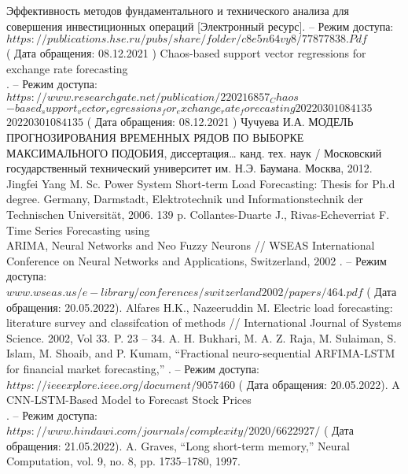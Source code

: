 \begin{thebibliography}{}
    \newblock Эффективность методов фундаментального и технического анализа для \\
    совершения  инвестиционных операций [Электронный ресурс]. – Режим доступа: 
    \newblock $https://publications.hse.ru/pubs/share/folder/c8e5n64vy8/77877838.Pdf$ \\
    ( Дата обращения: 08.12.2021 )
    \newblock Chaos-based support vector regressions for exchange rate forecasting \\
    . – Режим доступа: \\
    \newblock $https://www.researchgate.net/publication/220216857_Chaos$\\
    \newblock $-based_support_vector_regressions_for_exchange_rate_forecasting20220301084135$\\
    \newblock $20220301084135$ ( Дата обращения: 08.12.2021 )
    \newblock Чучуева И.А. МОДЕЛЬ ПРОГНОЗИРОВАНИЯ ВРЕМЕННЫХ РЯДОВ ПО ВЫБОРКЕ МАКСИМАЛЬНОГО ПОДОБИЯ, диссертация… канд. тех. наук / Московский государственный технический университет им. Н.Э. Баумана. Москва, 2012.
    \newblock Jingfei Yang M. Sc. Power System Short-term Load Forecasting: Thesis for Ph.d degree. Germany, Darmstadt, Elektrotechnik und Informationstechnik der Technischen Universität, 2006. 139 p.
    \newblock Collantes-Duarte J., Rivas-Echeverriat F. Time Series Forecasting using \\ 
    ARIMA, Neural Networks and Neo Fuzzy Neurons // WSEAS International Conference on Neural Networks and Applications, Switzerland, 2002
    . – Режим доступа:
    \newblock $www.wseas.us/e-library/conferences/switzerland2002/papers/464.pdf$ ( Дата обращения: 20.05.2022).
    \newblock Alfares H.K., Nazeeruddin M. Electric load forecasting: literature survey and classifcation of methods // International Journal of Systems Science. 2002, Vol 33. P. 23 – 34.
    \newblock A. H. Bukhari, M. A. Z. Raja, M. Sulaiman, S. Islam, M. Shoaib, and P. Kumam, “Fractional neuro-sequential ARFIMA-LSTM for financial market forecasting,” 
    . – Режим доступа:
    \newblock $https://ieeexplore.ieee.org/document/9057460$ ( Дата обращения: 20.05.2022).
    \newblock A CNN-LSTM-Based Model to Forecast Stock Prices \\
    . – Режим доступа: 
    \newblock $https://www.hindawi.com/journals/complexity/2020/6622927/$ ( Дата обращения: 21.05.2022).
    \newblock A. Graves, “Long short-term memory,” Neural Computation, vol. 9,
    no. 8, pp. 1735–1780, 1997.


\end{thebibliography}
\endgroup

\pagebreak